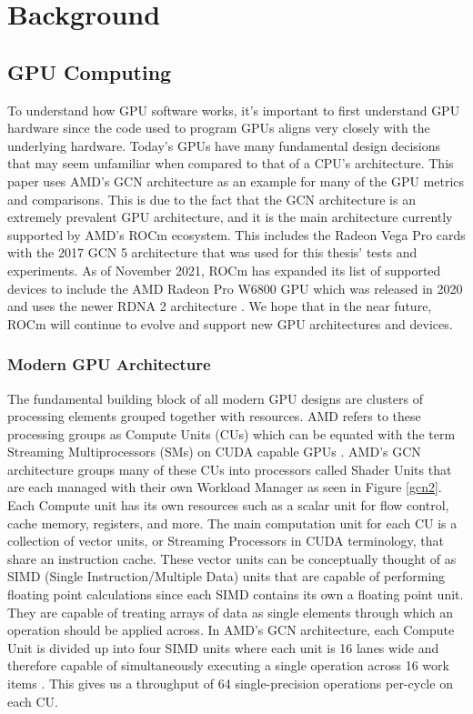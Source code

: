 \chapter{Background}

\section{GPU Computing}

To understand how GPU software works, it’s important to first understand GPU hardware since the code used to program GPUs aligns very closely with the underlying hardware. Today’s GPUs have many fundamental design decisions that may seem unfamiliar when compared to that of a CPU’s architecture. This paper uses AMD's GCN architecture as an example for many of the GPU metrics and comparisons. This is due to the fact that the GCN architecture is an extremely prevalent GPU architecture, and it is the main architecture currently supported by AMD's ROCm ecosystem. This includes the Radeon Vega Pro cards with the 2017 GCN 5 architecture that was used for this thesis' tests and experiments. As of November 2021, ROCm has expanded its list of supported devices to include the AMD Radeon Pro W6800 GPU which was released in 2020 and uses the newer RDNA 2 architecture \cite{rocmCompatibility}. We hope that in the near future, ROCm will continue to evolve and support new GPU architectures and devices.

\subsection{Modern GPU Architecture}

The fundamental building block of all modern GPU designs are clusters of processing elements grouped together with resources. AMD refers to these processing groups as Compute Units (CUs) which can be equated with the term Streaming Multiprocessors (SMs) on CUDA capable GPUs \cite{amdConferenceTalk}. AMD's GCN architecture groups many of these CUs into processors called Shader Units that are each managed with their own Workload Manager as seen in Figure \ref{gcn2}. Each Compute unit has its own resources such as a scalar unit for flow control, cache memory, registers, and more. The main computation unit for each CU is a collection of vector units, or Streaming Processors in CUDA terminology, that share an instruction cache. These vector units can be conceptually thought of as SIMD (Single Instruction/Multiple Data) units that are capable of performing floating point calculations since each SIMD contains its own a floating point unit. They are capable of treating arrays of data as single elements through which an operation should be applied across. In AMD’s GCN architecture, each Compute Unit is divided up into four SIMD units where each unit is 16 lanes wide and therefore capable of simultaneously executing a single operation across 16 work items \cite{gcnWhitepaper}. This gives us a throughput of 64 single-precision operations per-cycle on each CU.

